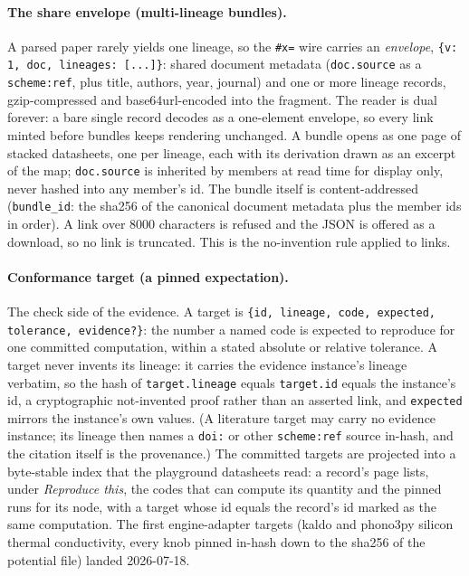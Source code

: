 \documentclass[11pt,a4paper]{article}
\begin{document}
\paragraph{The share envelope (multi-lineage bundles).} A parsed paper rarely
yields one lineage, so the \texttt{\#x=} wire carries an \emph{envelope},
\texttt{\{v: 1, doc, lineages: [...]\}}: shared document metadata
(\texttt{doc.source} as a \texttt{scheme:ref}, plus title, authors, year,
journal) and one or more lineage records, gzip-compressed and
base64url-encoded into the fragment. The reader is dual forever: a bare single
record decodes as a one-element envelope, so every link minted before bundles
keeps rendering unchanged. A bundle opens as one page of stacked datasheets,
one per lineage, each with its derivation drawn as an excerpt of the map;
\texttt{doc.source} is inherited by members at read time for display only,
never hashed into any member's id. The bundle itself is content-addressed
(\texttt{bundle\_id}: the sha256 of the canonical document metadata plus the
member ids in order). A link over 8000 characters is refused and the JSON is offered as a
download, so no link is truncated. This is the no-invention rule applied to
links.

\paragraph{Conformance target (a pinned expectation).} The check side of the
evidence. A target is \texttt{\{id, lineage, code, expected, tolerance,
evidence?\}}: the number a named code is expected to reproduce for one
committed computation, within a stated absolute or relative tolerance. A
target never invents its lineage: it carries the evidence instance's lineage
verbatim, so the hash of \texttt{target.lineage} equals \texttt{target.id}
equals the instance's id, a cryptographic not-invented proof rather than an
asserted link, and \texttt{expected} mirrors the instance's own values. (A
literature target may carry no evidence instance; its lineage then names a
\texttt{doi:} or other \texttt{scheme:ref} source in-hash, and the citation
itself is the provenance.) The
committed targets are projected into a byte-stable index that the playground
datasheets read: a record's page lists, under \emph{Reproduce this}, the codes
that can compute its quantity and the pinned runs for its node, with a target
whose id equals the record's id marked as the same computation. The first
engine-adapter targets (kaldo and phono3py silicon thermal conductivity, every
knob pinned in-hash down to the sha256 of the potential file) landed
2026-07-18.
\end{document}
